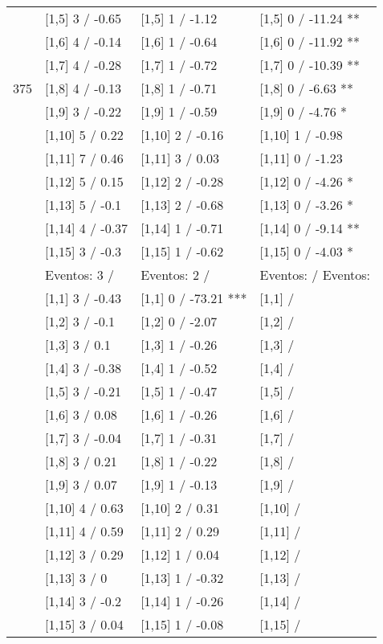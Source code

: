 \begin{table}
\begin{tabular}[t]{llll}
 & {}[1,5] 3  / -0.65 & {}[1,5] 1  / -1.12 & {}[1,5] 0  / -11.24 **\\
 & {}[1,6] 4  / -0.14 & {}[1,6] 1  / -0.64 & {}[1,6] 0  / -11.92 **\\
 & {}[1,7] 4  / -0.28 & {}[1,7] 1  / -0.72 & {}[1,7] 0  / -10.39 **\\
375 & {}[1,8] 4  / -0.13 & {}[1,8] 1  / -0.71 & {}[1,8] 0  / -6.63 **\\
\addlinespace
 & {}[1,9] 3  / -0.22 & {}[1,9] 1  / -0.59 & {}[1,9] 0  / -4.76 *\\
 & {}[1,10] 5  / 0.22 & {}[1,10] 2  / -0.16 & {}[1,10] 1  / -0.98\\
 & {}[1,11] 7  / 0.46 & {}[1,11] 3  / 0.03 & {}[1,11] 0  / -1.23\\
 & {}[1,12] 5  / 0.15 & {}[1,12] 2  / -0.28 & {}[1,12] 0  / -4.26 *\\
 & {}[1,13] 5  / -0.1 & {}[1,13] 2  / -0.68 & {}[1,13] 0  / -3.26 *\\
\addlinespace
 & {}[1,14] 4  / -0.37 & {}[1,14] 1  / -0.71 & {}[1,14] 0  / -9.14 **\\
 & {}[1,15] 3  / -0.3 & {}[1,15] 1  / -0.62 & {}[1,15] 0  / -4.03 *\\
 & Eventos:  3 / & Eventos:  2 / & Eventos:   / Eventos:\\
 & {}[1,1] 3  / -0.43 & {}[1,1] 0  / -73.21 *** & {}[1,1]  /\\
 & {}[1,2] 3  / -0.1 & {}[1,2] 0  / -2.07 & {}[1,2]  /\\
\addlinespace
 & {}[1,3] 3  / 0.1 & {}[1,3] 1  / -0.26 & {}[1,3]  /\\
 & {}[1,4] 3  / -0.38 & {}[1,4] 1  / -0.52 & {}[1,4]  /\\
 & {}[1,5] 3  / -0.21 & {}[1,5] 1  / -0.47 & {}[1,5]  /\\
 & {}[1,6] 3  / 0.08 & {}[1,6] 1  / -0.26 & {}[1,6]  /\\
 & {}[1,7] 3  / -0.04 & {}[1,7] 1  / -0.31 & {}[1,7]  /\\
\addlinespace
500 & {}[1,8] 3  / 0.21 & {}[1,8] 1  / -0.22 & {}[1,8]  /\\
 & {}[1,9] 3  / 0.07 & {}[1,9] 1  / -0.13 & {}[1,9]  /\\
 & {}[1,10] 4  / 0.63 & {}[1,10] 2  / 0.31 & {}[1,10]  /\\
 & {}[1,11] 4  / 0.59 & {}[1,11] 2  / 0.29 & {}[1,11]  /\\
 & {}[1,12] 3  / 0.29 & {}[1,12] 1  / 0.04 & {}[1,12]  /\\
\addlinespace
 & {}[1,13] 3  / 0 & {}[1,13] 1  / -0.32 & {}[1,13]  /\\
 & {}[1,14] 3  / -0.2 & {}[1,14] 1  / -0.26 & {}[1,14]  /\\
 & {}[1,15] 3  / 0.04 & {}[1,15] 1  / -0.08 & {}[1,15]  /\\
\bottomrule
\end{tabular}
\end{table}
